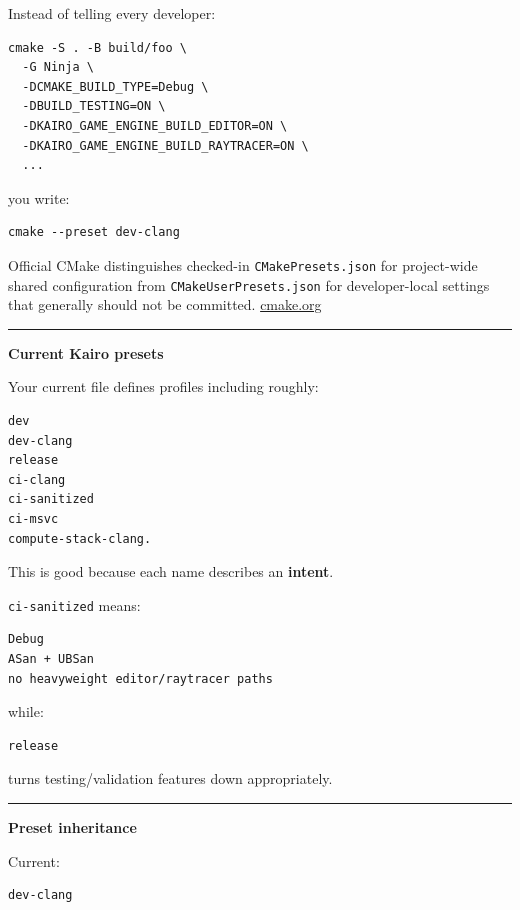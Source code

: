 Instead of telling every developer:

\begin{verbatim}
cmake -S . -B build/foo \
  -G Ninja \
  -DCMAKE_BUILD_TYPE=Debug \
  -DBUILD_TESTING=ON \
  -DKAIRO_GAME_ENGINE_BUILD_EDITOR=ON \
  -DKAIRO_GAME_ENGINE_BUILD_RAYTRACER=ON \
  ...
\end{verbatim}

you write:

\begin{verbatim}
cmake --preset dev-clang
\end{verbatim}

Official CMake distinguishes checked-in \texttt{CMakePresets.json} for project-wide shared configuration from \texttt{CMakeUserPresets.json} for developer-local settings that generally should not be committed. \href{https://cmake.org/cmake/help/latest/manual/cmake-presets.7.html?utm_source=chatgpt.com}{cmake.org}

\begin{center}\rule{0.5\linewidth}{0.5pt}\end{center}

\textbf{Current Kairo presets}

Your current file defines profiles including roughly:

\begin{verbatim}
dev
dev-clang
release
ci-clang
ci-sanitized
ci-msvc
compute-stack-clang.
\end{verbatim}

This is good because each name describes an \textbf{intent}.

\texttt{ci-sanitized} means:

\begin{verbatim}
Debug
ASan + UBSan
no heavyweight editor/raytracer paths
\end{verbatim}

while:

\begin{verbatim}
release
\end{verbatim}

turns testing/validation features down appropriately.

\begin{center}\rule{0.5\linewidth}{0.5pt}\end{center}

\textbf{Preset inheritance}

Current:

\begin{verbatim}
dev-clang
\end{verbatim}

